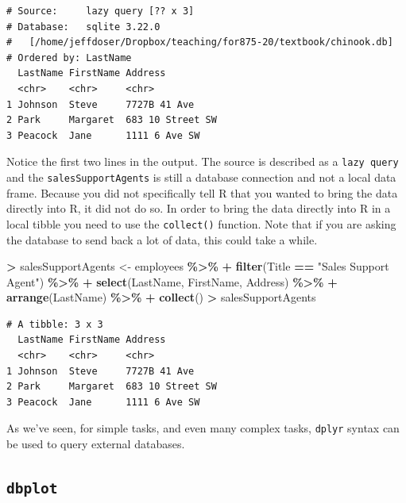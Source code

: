 \documentclass[
]{krantz}
\makeatletter
\newenvironment{Shaded}{\begin{snugshade}}{\end{snugshade}}
\newcommand{\KeywordTok}[1]{\textcolor[rgb]{0.27,0.27,0.27}{\textbf{#1}}}
\newcommand{\NormalTok}[1]{#1}
\newcommand{\OperatorTok}[1]{\textcolor[rgb]{0.43,0.43,0.43}{\textbf{#1}}}
\newcommand{\StringTok}[1]{\textcolor[rgb]{0.5,0.5,0.5}{#1}}
\newenvironment{kframe}{%
\medskip{}
\setlength{\fboxsep}{.8em}
 \def\at@end@of@kframe{}%
 \ifinner\ifhmode%
  \def\at@end@of@kframe{\end{minipage}}%
  \begin{minipage}{\columnwidth}%
 \fi\fi%
 \def\FrameCommand##1{\hskip\@totalleftmargin \hskip-\fboxsep
 \colorbox{shadecolor}{##1}\hskip-\fboxsep
     \hskip-\linewidth \hskip-\@totalleftmargin \hskip\columnwidth}%
 \MakeFramed {\advance\hsize-\width
   \@totalleftmargin\z@ \linewidth\hsize
   \@setminipage}}%
 {\par\unskip\endMakeFramed%
 \at@end@of@kframe}
\renewenvironment{Shaded}{\begin{kframe}}{\end{kframe}}
\makeatother
\begin{document}
\begin{verbatim}
# Source:     lazy query [?? x 3]
# Database:   sqlite 3.22.0
#   [/home/jeffdoser/Dropbox/teaching/for875-20/textbook/chinook.db]
# Ordered by: LastName
  LastName FirstName Address         
  <chr>    <chr>     <chr>           
1 Johnson  Steve     7727B 41 Ave    
2 Park     Margaret  683 10 Street SW
3 Peacock  Jane      1111 6 Ave SW   
\end{verbatim}

Notice the first two lines in the output. The source is described as a \texttt{lazy\ query} and the \texttt{salesSupportAgents} is still a database connection and not a local data frame. Because you did not specifically tell R that you wanted to bring the data directly into R, it did not do so. In order to bring the data directly into R in a local tibble you need to use the \texttt{collect()} function. Note that if you are asking the database to send back a lot of data, this could take a while.

\begin{Shaded}
\begin{Highlighting}[]
\OperatorTok{\textgreater{}}\StringTok{ }\NormalTok{salesSupportAgents \textless{}{-}}\StringTok{ }\NormalTok{employees }\OperatorTok{\%\textgreater{}\%}\StringTok{ }
\OperatorTok{+}\StringTok{   }\KeywordTok{filter}\NormalTok{(Title }\OperatorTok{==}\StringTok{ "Sales Support Agent"}\NormalTok{) }\OperatorTok{\%\textgreater{}\%}\StringTok{ }
\OperatorTok{+}\StringTok{   }\KeywordTok{select}\NormalTok{(LastName, FirstName, Address) }\OperatorTok{\%\textgreater{}\%}\StringTok{ }
\OperatorTok{+}\StringTok{   }\KeywordTok{arrange}\NormalTok{(LastName) }\OperatorTok{\%\textgreater{}\%}\StringTok{ }
\OperatorTok{+}\StringTok{   }\KeywordTok{collect}\NormalTok{()}
\OperatorTok{\textgreater{}}\StringTok{ }\NormalTok{salesSupportAgents}
\end{Highlighting}
\end{Shaded}

\begin{verbatim}
# A tibble: 3 x 3
  LastName FirstName Address         
  <chr>    <chr>     <chr>           
1 Johnson  Steve     7727B 41 Ave    
2 Park     Margaret  683 10 Street SW
3 Peacock  Jane      1111 6 Ave SW   
\end{verbatim}

As we've seen, for simple tasks, and even many complex tasks, \texttt{dplyr} syntax can be used to query external databases.

\hypertarget{dbplot}{%
\subsection{\texorpdfstring{\texttt{dbplot}}{dbplot}}\label{dbplot}}
\end{document}
